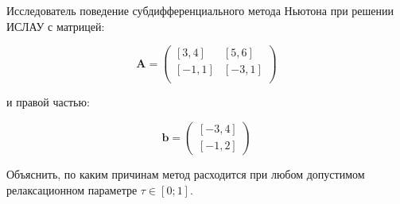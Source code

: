 Исследователь поведение субдифференциального метода Ньютона при решении ИСЛАУ с матрицей:

\begin{equation}
    \mathbf{A}=
    \begin{pmatrix}
    [3, 4] & [5, 6] \\
    [-1, 1	] & [-3, 1] \\
    \end{pmatrix}
\end{equation}

и правой частью:

\begin{equation}
\mathbf{b}=
\begin{pmatrix}
[-3, 4] \\
[-1, 2]
\end{pmatrix}
\end{equation}

Объяснить, по каким причинам метод расходится при любом допустимом релаксационном параметре $\tau \in [0; 1]$.